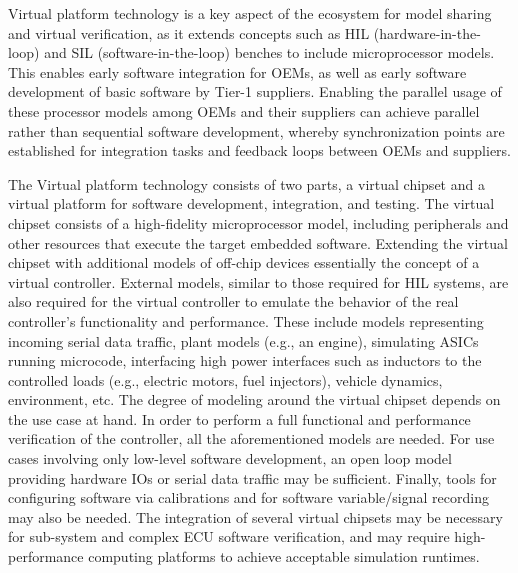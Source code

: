 Virtual platform technology is a key aspect of the ecosystem for model sharing and virtual verification,
as it extends concepts such as HIL (hardware-in-the-loop) and SIL (software-in-the-loop) benches to include microprocessor models.
This enables early software integration for OEMs,
as well as early software development of basic software by Tier-1 suppliers.
Enabling the parallel usage of these processor models among OEMs and their suppliers can achieve parallel rather than sequential software development,
whereby synchronization points are established for integration tasks and feedback loops between OEMs and suppliers.

The Virtual platform technology consists of two parts, a virtual chipset and a virtual platform for software development, integration, and testing.
The virtual chipset consists of a high-fidelity microprocessor model,
including peripherals and other resources that execute the target embedded software.
Extending the virtual chipset with additional models of off-chip devices essentially  the concept of a virtual controller.
External models, similar to those required for HIL systems, are also required for the virtual controller to emulate the behavior of the real controller's functionality and performance.
These include models representing incoming serial data traffic,
plant models (e.g., an engine), simulating ASICs running microcode, interfacing high power interfaces such as inductors to the controlled loads (e.g., electric motors, fuel injectors),
vehicle dynamics, environment, etc.
The degree of modeling around the virtual chipset depends on the use case at hand.
In order to perform a full functional and performance verification of the controller, all the aforementioned models are needed.
For use cases involving only low-level software development, an open loop model providing hardware IOs or serial data traffic may be sufficient.
Finally, tools for configuring software via calibrations and for software variable/signal recording may also be needed.
The integration of several virtual chipsets may be necessary for sub-system and complex ECU software verification, and may require high-performance computing platforms to achieve acceptable simulation runtimes.